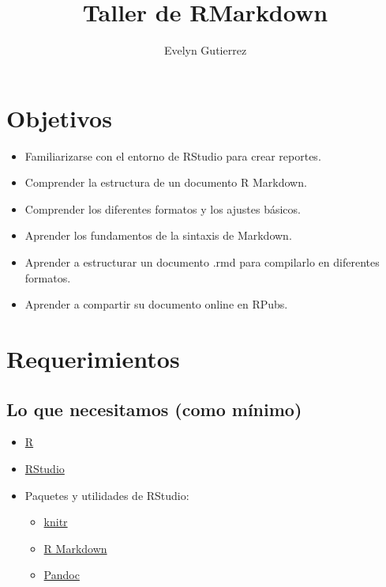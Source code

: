 \documentclass[
]{article}
\title{Taller de RMarkdown}
\author{Evelyn Gutierrez}
\date{}
\providecommand{\tightlist}{%
  \setlength{\itemsep}{0pt}\setlength{\parskip}{0pt}}
\begin{document}
\maketitle

{
\setcounter{tocdepth}{3}
\tableofcontents
}
\hypertarget{objetivos}{%
\section{Objetivos}\label{objetivos}}

\begin{itemize}
\item
  Familiarizarse con el entorno de RStudio para crear reportes.
\item
  Comprender la estructura de un documento R Markdown.
\item
  Comprender los diferentes formatos y los ajustes básicos.
\item
  Aprender los fundamentos de la sintaxis de Markdown.
\item
  Aprender a estructurar un documento .rmd para compilarlo en diferentes
  formatos.
\item
  Aprender a compartir su documento online en RPubs.
\end{itemize}

\hypertarget{requerimientos}{%
\section{Requerimientos}\label{requerimientos}}

\hypertarget{lo-que-necesitamos-como-muxednimo}{%
\subsection{Lo que necesitamos (como
mínimo)}\label{lo-que-necesitamos-como-muxednimo}}

\begin{itemize}
\tightlist
\item
  \href{https://cran.r-project.org/bin/windows/base/}{R}
\item
  \href{https://rstudio.com/products/rstudio/download/}{RStudio}
\item
  Paquetes y utilidades de RStudio:

  \begin{itemize}
  \tightlist
  \item
    \href{https://cran.r-project.org/web/packages/knitr/index.html}{knitr}
  \item
    \href{https://rmarkdown.rstudio.com/}{R Markdown}
  \item
    \href{https://rmarkdown.rstudio.com/docs/articles/pandoc.html}{Pandoc}
  \end{itemize}
\end{itemize}
\end{document}
